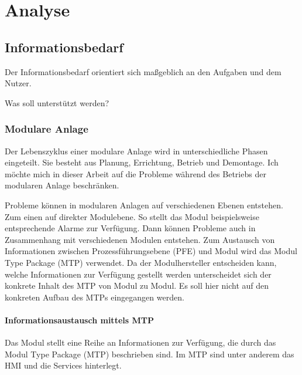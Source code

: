 
\chapter{Analyse}
\label{sec:Anforderungsanalyse}

\section{Informationsbedarf}
Der Informationsbedarf orientiert sich maßgeblich an den Aufgaben und dem Nutzer.

Was soll unterstützt werden?

\subsection{Modulare Anlage}
Der Lebenszyklus einer modulare Anlage wird in unterschiedliche Phasen eingeteilt. Sie besteht aus Planung, Errichtung, Betrieb und Demontage. \cite{} Ich möchte mich in dieser Arbeit auf die Probleme während des Betriebs der modularen Anlage beschränken. 

Probleme können in modularen Anlagen auf verschiedenen Ebenen entstehen. Zum einen auf direkter Modulebene. So stellt das Modul beispielsweise entsprechende Alarme zur Verfügung. Dann können Probleme auch in Zusammenhang mit verschiedenen Modulen entstehen. Zum Austausch von Informationen zwischen Prozessführungsebene (PFE) und Modul wird das Modul Type Package (MTP) verwendet. Da der Modulhersteller entscheiden kann, welche Informationen zur Verfügung gestellt werden unterscheidet sich der konkrete Inhalt des MTP von Modul zu Modul. Es soll hier nicht auf den konkreten Aufbau des MTPs eingegangen werden.

\subsubsection{Informationsaustausch mittels MTP}
Das Modul stellt eine Reihe an Informationen zur Verfügung, die durch das Modul Type Package (MTP) beschrieben sind. Im MTP sind unter anderem das HMI und die Services hinterlegt.

